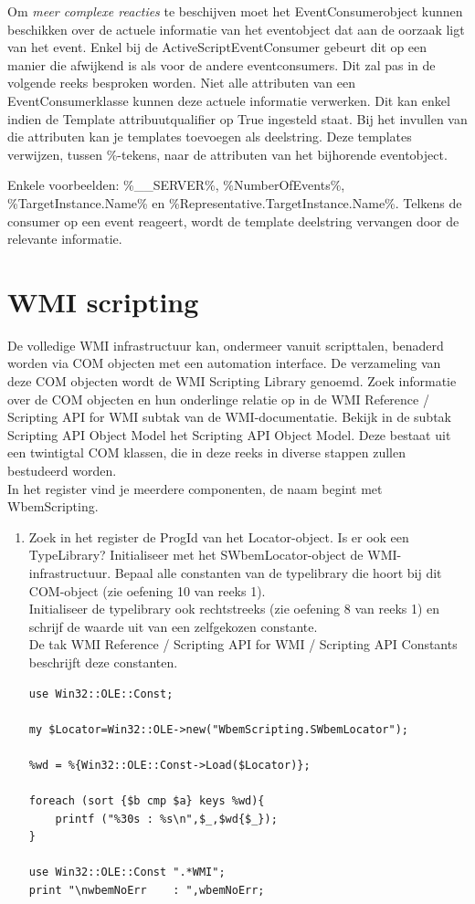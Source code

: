 \documentclass[11pt,a4paper]{report}
\begin{document}
Om \textit{meer complexe reacties} te beschijven moet het EventConsumerobject kunnen beschikken over de actuele informatie van het eventobject dat aan de oorzaak ligt van het event. Enkel bij de ActiveScriptEventConsumer gebeurt dit op een manier die afwijkend is als voor de andere eventconsumers. Dit zal pas in de volgende reeks besproken worden. Niet alle attributen van een EventConsumerklasse kunnen deze actuele informatie verwerken. Dit kan enkel indien de Template attribuutqualifier op True ingesteld staat. Bij het invullen van die attributen kan je templates toevoegen als deelstring. Deze templates verwijzen, tussen \%-tekens, naar de attributen van het bijhorende eventobject. 
\par Enkele voorbeelden: \%\_\_SERVER\%, \%NumberOfEvents\%, \%TargetInstance.Name\% en \%Representative.TargetInstance.Name\%. Telkens de consumer op een event reageert, wordt de template deelstring vervangen door de relevante informatie.
\chapter{WMI scripting}
De volledige WMI infrastructuur kan, ondermeer vanuit scripttalen, benaderd worden via COM objecten met een automation interface. De verzameling van deze COM objecten wordt de WMI Scripting Library genoemd. Zoek informatie over de COM objecten en hun onderlinge relatie op in de WMI Reference / Scripting API for WMI subtak van de WMI-documentatie. Bekijk in de subtak Scripting API Object Model het Scripting API Object Model. Deze bestaat uit een twintigtal COM klassen, die in deze reeks in diverse stappen zullen bestudeerd worden.\\
In het register vind je meerdere componenten, de naam begint met WbemScripting.
\begin{enumerate}
	\item Zoek in het register de ProgId van het Locator-object. Is er ook een TypeLibrary?
	Initialiseer met het SWbemLocator-object de WMI-infrastructuur. Bepaal alle constanten van de typelibrary die hoort bij dit COM-object (zie oefening 10 van reeks 1).
	\\Initialiseer de typelibrary ook rechtstreeks (zie oefening 8 van reeks 1) en schrijf de waarde uit van een zelfgekozen constante.
	\\De tak WMI Reference / Scripting API for WMI / Scripting API Constants beschrijft deze constanten.
	\begin{lstlisting}
use Win32::OLE::Const;

my $Locator=Win32::OLE->new("WbemScripting.SWbemLocator");

%wd = %{Win32::OLE::Const->Load($Locator)}; 

foreach (sort {$b cmp $a} keys %wd){
	printf ("%30s : %s\n",$_,$wd{$_});
}

use Win32::OLE::Const ".*WMI";      
print "\nwbemNoErr    : ",wbemNoErr;  
	\end{lstlisting}
\end{enumerate}
\end{document}
